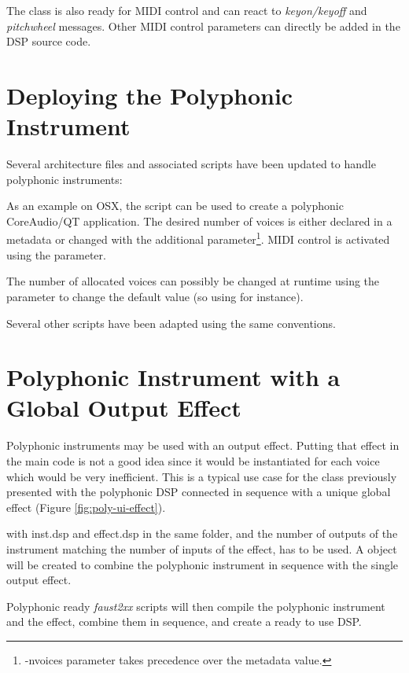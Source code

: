 The  class is also ready for MIDI control and can react to {\it keyon/keyoff} and {\it pitchwheel} messages. Other MIDI control parameters can directly be added in the DSP source code. 

\section{Deploying the Polyphonic Instrument}

Several architecture files and associated scripts have been updated to handle polyphonic instruments:

As an example on OSX, the script  can be used to create a polyphonic CoreAudio/QT application. The desired number of voices is either declared in a  metadata or changed with the  additional parameter\footnote{-nvoices parameter takes precedence over the  metadata value.}. MIDI control is activated using the  parameter. 

The number of allocated voices can possibly be changed at runtime using the  parameter to change the default value (so using  for instance). 

Several other scripts have been adapted using the same conventions.

\section{Polyphonic Instrument with a Global Output Effect}

Polyphonic instruments may be used with an output effect. Putting that effect in the main \faust code is not a good idea since it would be instantiated for each voice which would be very inefficient. This is a typical use case for the   class previously presented with the polyphonic DSP connected in sequence with a unique global effect (Figure \ref{fig:poly-ui-effect}). 

 with inst.dsp and effect.dsp in the same folder,  and the number of outputs of the instrument matching the number of inputs of the effect, has to be used. A  object will be created to combine the polyphonic instrument in sequence with the single output effect. 

Polyphonic ready  {\it faust2xx} scripts will then compile the polyphonic instrument and the effect, combine them in sequence, and create a ready to use DSP.  

